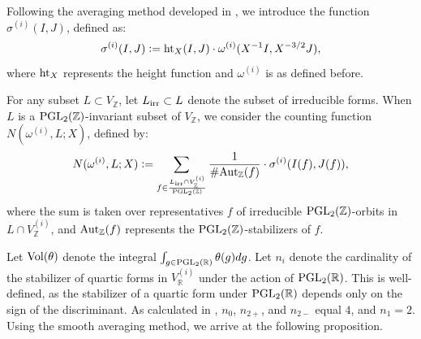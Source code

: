 \documentclass{article}
\def\Z{{\mathbb Z}}
\def\PGL{{\rm PGL}}
\def\Aut{{\rm Aut}}
\def\irr{{\rm irr}}
\def\Vol{{\rm Vol}}
\def\Z{{\mathbb Z}}
\def \h{{\rm ht}}
\begin{document}
Following the averaging method developed in \cite{moment}, we introduce the function $\sigma^{(i)}(I, J)$, defined as:
\begin{equation*}
\sigma^{(i)}(I, J) \vcentcolon= \h_X(I, J) \cdot \omega^{(i)}(X^{-1}I, X^{-3/2}J),
\end{equation*}
where $\h_X$ represents the height function and $\omega^{(i)}$ is as defined before.


For any subset $L \subset V_{\mathbb{Z}}$, let $L_{\irr} \subset L$ denote the subset of irreducible forms. When $L$ is a $\PGL_2(\mathbb{Z})$-invariant subset of $V_{\mathbb{Z}}$, we consider the counting function $N(\omega^{(i)}, L; X)$, defined by:
\begin{equation*}
N(\omega^{(i)}, L; X) \vcentcolon= \sum_{f \in \frac{L_{\irr} \cap V_{\Z}^{(i)}}{\PGL_2(\mathbb{Z})}} \frac{1}{\#\Aut_{\mathbb{Z}}(f)} \cdot \sigma^{(i)}(I(f), J(f)),
\end{equation*}
where the sum is taken over representatives $f$ of irreducible $\PGL_2(\mathbb{Z})$-orbits in $L\cap V_{\Z}^{(i)}$, and $\Aut_{\mathbb{Z}}(f)$ represents the $\PGL_2(\mathbb{Z})$-stabilizers of $f$. 



Let $\Vol(\theta)$ denote the integral $\int_{g \in \PGL_2(\mathbb{R})} \theta(g)  dg$. Let $n_i$ denote the cardinality of the stabilizer of quartic forms in $V_{\mathbb{R}}^{(i)}$ under the action of $\PGL_2(\mathbb{R})$. This is well-defined, as the stabilizer of a quartic form under $\PGL_2(\mathbb{R})$ depends only on the sign of the discriminant.  As calculated in \cite{main}, $n_{0}$, $n_{2+}$, and $n_{2-}$ equal $4$, and $n_1 = 2$. Using the smooth averaging method, we arrive at the following proposition.
\end{document}

